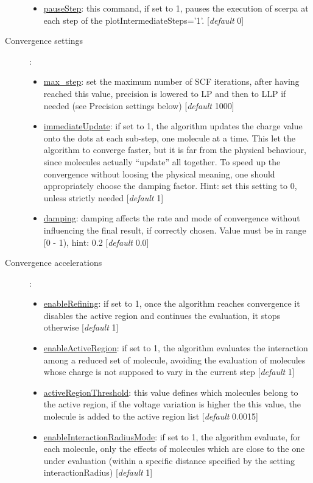 \documentclass[a4paper,10pt]{article}
\begin{document}
\begin{description}
\begin{itemize}
	\item \underline{pauseStep}: this command, if set to 1, pauses the execution of scerpa at each step of the plotIntermediateSteps='1'. [\textit{default} 0] 
	\end{itemize}
\item[Convergence settings]:
	\begin{itemize}
	\item \underline{max\_step}: set the maximum number of SCF iterations, after having reached this value, precision is lowered to LP and then to LLP if needed (see Precision settings below) [\textit{default} 1000] 
	\item \underline{immediateUpdate}: if set to 1, the algorithm updates the charge value onto the dots at each sub-step, one molecule at a time. This let the algorithm to converge faster, but it is far from the physical behaviour, since molecules actually \enquote{update} all together. To speed up the convergence without loosing the physical meaning, one should appropriately choose the damping factor. Hint: set this setting to 0, unless strictly needed [\textit{default} 1] 
	\item \underline{damping}: damping affects the rate and mode of convergence without influencing the final result, if correctly chosen. Value must be in range [0 - 1), hint: 0.2 [\textit{default} 0.0] 
	\end{itemize}
\item[Convergence accelerations]:
	\begin{itemize}
	\item \underline{enableRefining}: if set to 1, once the algorithm reaches convergence it disables the active region and continues the evaluation, it stops otherwise [\textit{default} 1] 
	\item \underline{enableActiveRegion}: if set to 1, the algorithm evaluates the interaction among a reduced set of molecule, avoiding the evaluation of molecules whose charge is not supposed to vary in the current step [\textit{default} 1] 
	\item \underline{activeRegionThreshold}: this value defines which molecules belong to the active region, if the voltage variation is higher  the this value, the molecule is added to the active region list [\textit{default} 0.0015] 
	\item \underline{enableInteractionRadiusMode}: if set to 1, the algorithm evaluate, for each molecule, only the effects of molecules which are close to the one under evaluation (within a specific distance specified by the setting interactionRadius) [\textit{default} 1] 

\end{itemize}
\end{description}
\end{document}
